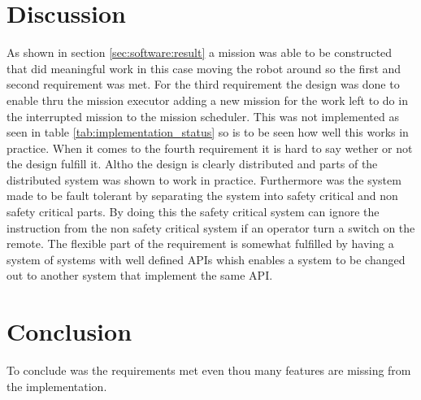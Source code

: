 \documentclass{article}
\begin{document}
\section{Discussion}
As shown in section \ref{sec:software:result} a mission was able to be constructed that did meaningful work in this case moving the robot around so the first and second requirement was met. For the third requirement the design was done to enable thru the mission executor adding a new mission for the work left to do in the interrupted mission to the mission scheduler. 
This was not implemented as seen in table \ref{tab:implementation_status} so is to be seen how well this works in practice.
When it comes to the fourth requirement it is hard to say wether or not the design fulfill it. Altho the design is clearly distributed and parts of the distributed system was shown to work in practice. Furthermore was the system made to be fault tolerant by separating the system into safety critical and non safety critical parts. By doing this the safety critical system can ignore the instruction from the non safety critical system if an operator turn a switch on the remote. The flexible part of the requirement is somewhat fulfilled by having a system of systems with well defined APIs whish enables a system to be changed out to another system that implement the same API.

\section{Conclusion}
To conclude was the requirements met even thou many features are missing from the implementation.

\printbibliography
\end{document}

